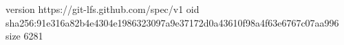 version https://git-lfs.github.com/spec/v1
oid sha256:91e316a82b4e4304e1986323097a9e37172d0a43610f98a4f63e6767c07aa996
size 6281
